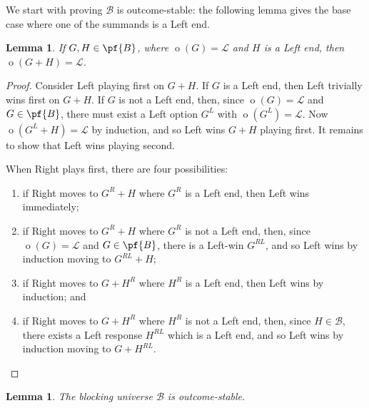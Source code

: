 \documentclass[11pt]{article}
\newtheorem{lemma}[theorem]{Lemma}
\theoremstyle{definition}
\DeclareMathOperator{\outcome}{o}
\newcommand{\set}[1]{\mathcal{#1}}
\begin{document}
We start with proving $\set{B}$ is outcome-stable: the following lemma gives
the base case where one of the summands is a Left end.

\begin{lemma}
    \label{lem:L+end}
    If $G,H\in\pf{B}$, where $\outcome(G)=\mathscr{L}$ and $H$ is a Left end,
    then $\outcome(G+H)=\mathscr{L}$.
\end{lemma}

\begin{proof}
    Consider Left playing first on $G+H$. If $G$ is a Left end, then Left
    trivially wins first on $G+H$. If $G$ is not a Left end, then, since
    $\outcome(G)=\mathscr{L}$ and $G\in\pf{B}$, there must exist a Left option
    $G^L$ with $\outcome(G^L)=\mathscr{L}$. Now $\outcome(G^L+H)=\mathscr{L}$
    by induction, and so Left wins $G+H$ playing first. It remains to show that
    Left wins playing second.

    When Right plays first, there are four possibilities:
    \begin{enumerate}
        \item
            if Right moves to $G^R+H$ where $G^R$ is a Left end, then Left wins
            immediately;
        \item
            if Right moves to $G^R+H$ where $G^R$ is not a Left end, then,
            since $\outcome(G)=\mathscr{L}$ and $G\in\pf{B}$, there is a
            Left-win $G^{RL}$, and so Left wins by induction moving to
            $G^{RL}+H$;
        \item
            if Right moves to $G+H^R$ where $H^R$ is a Left end, then Left wins
            by induction; and
        \item
            if Right moves to $G+H^R$ where $H^R$ is not a Left end, then,
            since $H\in\set{B}$, there exists a Left response $H^{RL}$ which is
            a Left end, and so Left wins by induction moving to $G+H^{RL}$.
    \end{enumerate}
\end{proof}

\begin{lemma}
    \label{lem:B-outcome-stable}
    The blocking universe $\set{B}$ is outcome-stable.
\end{lemma}
\end{document}
